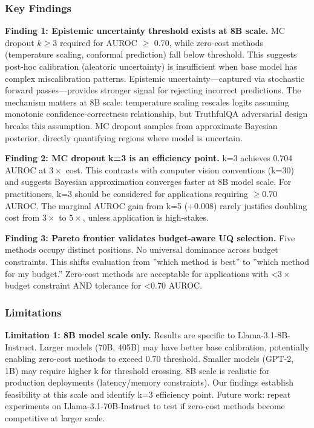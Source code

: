 
\subsubsection{Key Findings}

\textbf{Finding 1: Epistemic uncertainty threshold exists at 8B scale.} MC dropout $k\geq 3$ required for AUROC $\geq$ 0.70, while zero-cost methods (temperature scaling, conformal prediction) fall below threshold. This suggests post-hoc calibration (aleatoric uncertainty) is insufficient when base model has complex miscalibration patterns. Epistemic uncertainty---captured via stochastic forward passes---provides stronger signal for rejecting incorrect predictions. The mechanism matters at 8B scale: temperature scaling rescales logits assuming monotonic confidence-correctness relationship, but TruthfulQA adversarial design breaks this assumption. MC dropout samples from approximate Bayesian posterior, directly quantifying regions where model is uncertain.

\textbf{Finding 2: MC dropout k=3 is an efficiency point.} k=3 achieves 0.704 AUROC at $3\times$ cost. This contrasts with computer vision conventions (k=30) and suggests Bayesian approximation converges faster at 8B model scale. For practitioners, k=3 should be considered for applications requiring $\geq 0.70$ AUROC. The marginal AUROC gain from k=5 (+0.008) rarely justifies doubling cost from $3\times$ to $5\times$, unless application is high-stakes.

\textbf{Finding 3: Pareto frontier validates budget-aware UQ selection.} Five methods occupy distinct positions. No universal dominance across budget constraints. This shifts evaluation from ''which method is best'' to ''which method for my budget.'' Zero-cost methods are acceptable for applications with <$3\times$ budget constraint AND tolerance for <0.70 AUROC.

\subsubsection{Limitations}

\textbf{Limitation 1: 8B model scale only.} Results are specific to Llama-3.1-8B-Instruct. Larger models (70B, 405B) may have better base calibration, potentially enabling zero-cost methods to exceed 0.70 threshold. Smaller models (GPT-2, 1B) may require higher k for threshold crossing. 8B scale is realistic for production deployments (latency/memory constraints). Our findings establish feasibility at this scale and identify k=3 efficiency point. Future work: repeat experiments on Llama-3.1-70B-Instruct to test if zero-cost methods become competitive at larger scale.

